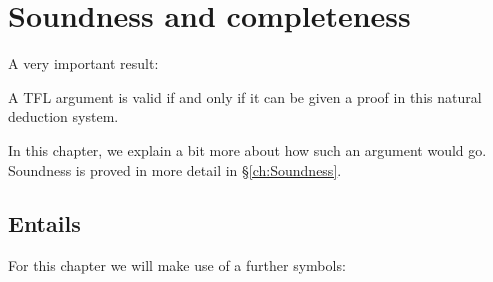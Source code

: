 \chapter{Soundness and completeness}
\label{sec:soundness_and_completeness}\nonexaminable

A very important result:
\begin{highlighted}
A TFL argument is valid if and only if it can be given a proof in this natural deduction system. 
\end{highlighted}
In this chapter, we explain a bit more about how such an argument would go. Soundness is proved in more detail in \S\ref{ch:Soundness}. 



\section{Entails}
For this chapter we will make use of a further symbols: 
%

